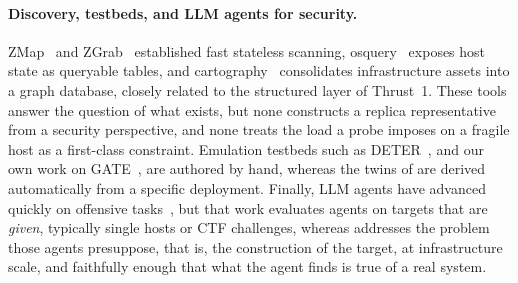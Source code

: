 \paragraph{Discovery, testbeds, and LLM agents for security.}
ZMap~\cite{zmap} and ZGrab~\cite{zgrab} established fast stateless scanning,
osquery~\cite{osquery} exposes host state as queryable tables, and
cartography~\cite{cartography} consolidates infrastructure assets into a
graph database, closely related to the structured layer of Thrust~1. These
tools answer the question of what exists, but none constructs a replica
representative from a security perspective, and none treats the load a probe
imposes on a fragile host as a first-class constraint. Emulation testbeds
such as DETER~\cite{deterlab}, and our own work on GATE~\cite{action}, are
authored by hand, whereas the twins of \sysname are derived automatically
from a specific deployment. Finally, LLM agents have advanced quickly on
offensive tasks~\cite{pentestgpt,cybench,measuring}, but that work evaluates
agents on targets that are \emph{given}, typically single hosts or CTF
challenges, whereas \sysname addresses the problem those agents presuppose,
that is, the construction of the target, at infrastructure scale, and
faithfully enough that what the agent finds is true of a real system.
